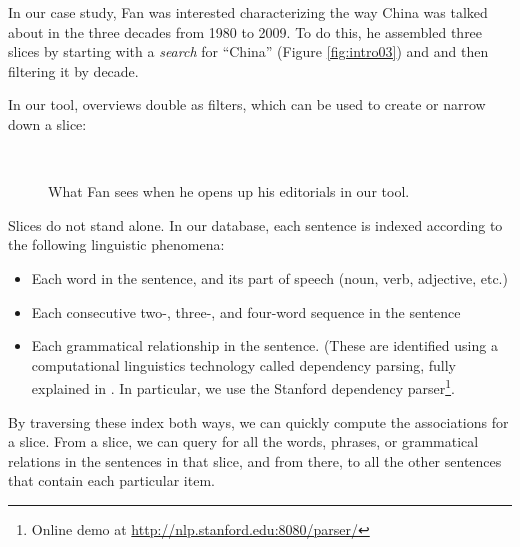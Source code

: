 \documentclass{sig-alternate}
\begin{document}
In our case study, Fan was interested characterizing the way China was talked about in the three decades from 1980 to 2009. To do this, he assembled three slices by starting with a \emph{search} for ``China'' (Figure \ref{fig:intro03}) and and then filtering it by decade. 

In our tool, overviews double as filters, which can be used to create or narrow down a slice:
\begin{figure}[ht!]
\begin{center}
%
        \\
%
    \end{center}
    \caption{%
        What Fan sees when he opens up his editorials in our tool. \label{fig:intro04}
     }%
\end{figure}

Slices do not stand alone. In our database, each sentence is indexed according to the following linguistic phenomena:
\begin{itemize}
  \item Each word in the sentence, and its part of speech (noun, verb, adjective, etc.)
  \item Each consecutive two-, three-, and four-word sequence in the sentence
  \item Each grammatical relationship in the sentence. (These are identified using a computational linguistics technology called dependency parsing, fully explained in \cite{jurafsky_chapter_2009}. In particular, we use the Stanford dependency parser\footnote{Online demo  at \url{http://nlp.stanford.edu:8080/parser/}}\cite{klein_accurate_2003}.
\end{itemize}
By traversing these index both ways, we can quickly compute the associations for a slice. From a slice, we can query for all the words, phrases, or grammatical relations in the sentences in that slice, and from there, to all the other sentences that contain each particular item.
\end{document}
